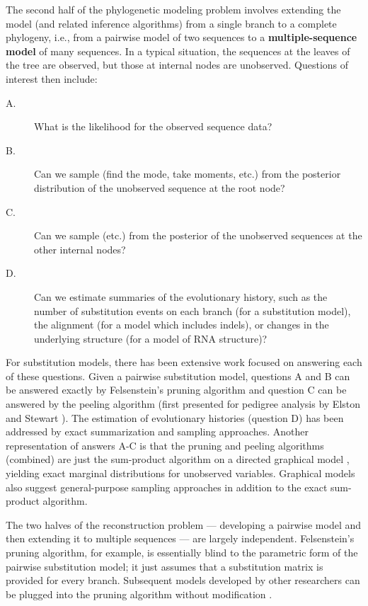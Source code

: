 \documentclass[10pt]{article}
\begin{document}
The second half of the phylogenetic modeling problem involves extending the model (and related inference algorithms) from a single branch to a complete phylogeny,
i.e., from a pairwise model of two sequences to a {\bf multiple-sequence model} of many sequences.
In a typical situation, the sequences at the leaves of the tree are observed, but those at internal nodes are unobserved.
Questions of interest then include:
\begin{description}
\item[A.] What is the likelihood for the observed sequence data?
\item[B.] Can we sample (find the mode, take moments, etc.) from the posterior distribution of the unobserved sequence at the root node?
\item[C.] Can we sample (etc.) from the posterior of the unobserved sequences at the other internal nodes?
\item[D.] Can we estimate summaries of the evolutionary history, such as
  the number of substitution events on each branch (for a substitution
  model), the alignment (for a model which includes indels), or
  changes in the underlying structure (for a model of RNA structure)?
\end{description}

For substitution models, there has been extensive work focused on answering each of these questions.
Given a pairwise substitution model, questions A and B can be
answered exactly by Felsenstein's pruning algorithm
\cite{Felsenstein81} and question C can be answered by the peeling
algorithm (first presented for pedigree analysis by Elston and Stewart \cite{ElstonStewart71}).
The estimation of evolutionary histories (question D) has been
addressed by exact summarization \cite{HolmesRubin2002b} and sampling
\cite{Nielsen2001} approaches.
Another representation of answers A-C
is that the pruning and peeling algorithms (combined) are just
the sum-product algorithm on a directed graphical model \cite{Pearl82},
yielding exact marginal distributions for unobserved variables.
Graphical models also suggest general-purpose sampling approaches
in addition to the exact sum-product algorithm.

The two halves of the reconstruction problem --- developing a pairwise model and then extending it to multiple sequences --- are largely independent.
Felsenstein's pruning algorithm, for example, is essentially blind to the parametric form of the pairwise substitution model;
it just assumes that a substitution matrix is provided for every branch.
Subsequent models developed by other researchers can be plugged into the pruning algorithm without modification \cite{Yang94b,WhelanGoldman2001}.
\end{document}
